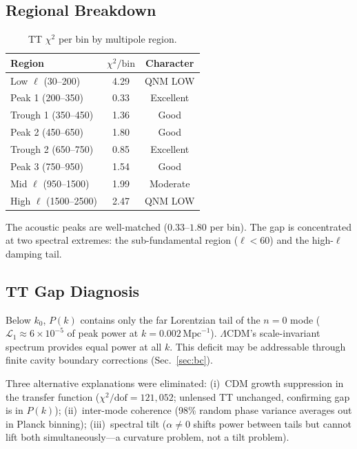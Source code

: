 \documentclass[aps,prd,twocolumn,superscriptaddress,showpacs,preprintnumbers,amsmath,amssymb,nofootinbib]{revtex4-2}
\newcommand{\lcdm}{$\Lambda$CDM}
\newcommand{\Mpc}{\,\mathrm{Mpc}}
\begin{document}
\subsection{Regional Breakdown}
\label{sec:regional}

\begin{table}[t]
\caption{\label{tab:regional}TT $\chi^2$ per bin by multipole region.}
\begin{ruledtabular}
\begin{tabular}{lcc}
Region & $\chi^2/\mathrm{bin}$ & Character \\
\hline
Low $\ell$ (30--200) & 4.29 & QNM LOW \\
Peak 1 (200--350) & 0.33 & Excellent \\
Trough 1 (350--450) & 1.36 & Good \\
Peak 2 (450--650) & 1.80 & Good \\
Trough 2 (650--750) & 0.85 & Excellent \\
Peak 3 (750--950) & 1.54 & Good \\
Mid $\ell$ (950--1500) & 1.99 & Moderate \\
High $\ell$ (1500--2500) & 2.47 & QNM LOW \\
\end{tabular}
\end{ruledtabular}
\end{table}

The acoustic peaks are well-matched ($0.33$--$1.80$ per bin). The gap is concentrated at two spectral extremes: the sub-fundamental region ($\ell < 60$) and the high-$\ell$ damping tail.


\subsection{TT Gap Diagnosis}
\label{sec:gap}

Below $k_0$, $P(k)$ contains only the far Lorentzian tail of the $n = 0$ mode ($\mathcal{L}_1 \approx 6 \times 10^{-5}$ of peak power at $k = 0.002\Mpc^{-1}$). \lcdm's scale-invariant spectrum provides equal power at all $k$. This deficit may be addressable through finite cavity boundary corrections (Sec.~\ref{sec:bc}).

Three alternative explanations were eliminated: (i)~CDM growth suppression in the transfer function ($\chi^2/\mathrm{dof} = 121{,}052$; unlensed TT unchanged, confirming gap is in $P(k)$); (ii)~inter-mode coherence (98\% random phase variance averages out in Planck binning); (iii)~spectral tilt ($\alpha \neq 0$ shifts power between tails but cannot lift both simultaneously---a curvature problem, not a tilt problem).
\end{document}
